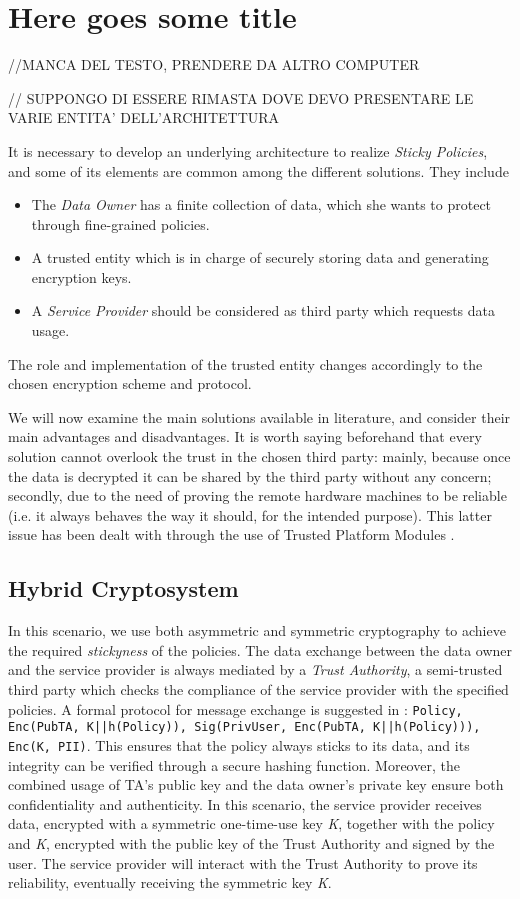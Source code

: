 \chapter{Here goes some title}
\label{capitolo2}
\thispagestyle{empty}

//MANCA DEL TESTO, PRENDERE DA ALTRO COMPUTER

// SUPPONGO DI ESSERE RIMASTA DOVE DEVO PRESENTARE LE VARIE ENTITA' DELL'ARCHITETTURA

It is necessary to develop an underlying architecture to realize \textit{Sticky Policies}, and some of its elements are common among the different solutions. They include
 \begin{itemize}
 	\item The \textit{Data Owner} has a finite collection of data, which she wants to protect through fine-grained policies.
 	\item A trusted entity which is in charge of securely storing data and generating encryption keys.
 	\item A \textit{Service Provider} should be considered as third party which requests data usage.
 \end{itemize}
The role and implementation of the trusted entity changes accordingly to the chosen encryption scheme and protocol.

We will now examine the main solutions available in literature, and consider their main advantages and disadvantages. It is worth saying beforehand that every solution cannot overlook the trust in the chosen third party: mainly, because once the data is decrypted it can be shared by the third party without any concern; secondly, due to the need of proving the remote hardware machines to be reliable (i.e. it always behaves the way it should, for the intended purpose). This latter issue has been dealt with through the use of Trusted Platform Modules \cite{standard2009trusted}.

\section{Hybrid Cryptosystem}
In this scenario, we use both asymmetric and symmetric cryptography to achieve the required \textit{stickyness} of the policies. The data exchange between the data owner and the service provider is always mediated by a \textit{Trust Authority}, a semi-trusted third party which checks the compliance of the service provider with the specified policies. A formal protocol for message exchange is suggested in \cite{pearson2011sticky}: \texttt{Policy, Enc(PubTA, K||h(Policy)), Sig(PrivUser, Enc(PubTA, K||h(Policy))), Enc(K, PII)}. This ensures that the policy always sticks to its data, and its integrity can be verified through a secure hashing function. Moreover, the combined usage of TA's public key and the data owner's private key ensure both confidentiality and authenticity. In this scenario, the service provider receives data, encrypted with a symmetric one-time-use key \textit{K}, together with the policy and \textit{K}, encrypted with the public key of the Trust Authority and signed by the user. The service provider will interact with the Trust Authority to prove its reliability, eventually receiving the symmetric key \textit{K}.

